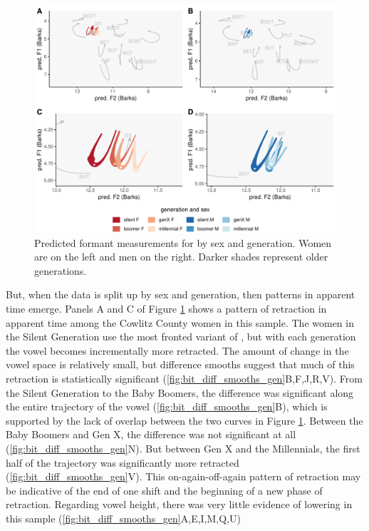 \begin{figure}[tb!]
	\centering
	\includegraphics[width = 6.5in]{Figures/BIT/BIT_four_panel_plot.pdf}
	\caption[Predicted formant measurements for \bit by sex and generation.]{Predicted formant measurements for \bit by sex and generation. Women are on the left and men on the right. Darker shades represent older generations.}
	\label{fig:BIT_four_panel}
\end{figure}

But, when the data is split up by sex and generation, then patterns in apparent time emerge. Panels A and C of Figure \ref{fig:BIT_four_panel} shows a pattern of \bit retraction in apparent time among the Cowlitz County women in this sample. The women in the Silent Generation use the most fronted variant of \bit, but with each generation the vowel becomes incrementally more retracted. The amount of change in the vowel space is relatively small, but difference smooths suggest that much of this retraction is statistically significant (\ref{fig:bit_diff_smooths_gen}B,F,J,R,V). From the Silent Generation to the Baby Boomers, the difference was significant along the entire trajectory of the vowel (\ref{fig:bit_diff_smooths_gen}B), which is supported by the lack of overlap between the two curves in Figure \ref{fig:BIT_four_panel}. Between the Baby Boomers and Gen X, the difference was not significant at all (\ref{fig:bit_diff_smooths_gen}N). But between Gen X and the Millennials, the first half of the trajectory was significantly more retracted (\ref{fig:bit_diff_smooths_gen}V). This on-again-off-again pattern of retraction may be indicative of the end of one shift and the beginning of a new phase of \bit retraction. Regarding vowel height, there was very little evidence of \bit lowering in this sample (\ref{fig:bit_diff_smooths_gen}A,E,I,M,Q,U)

